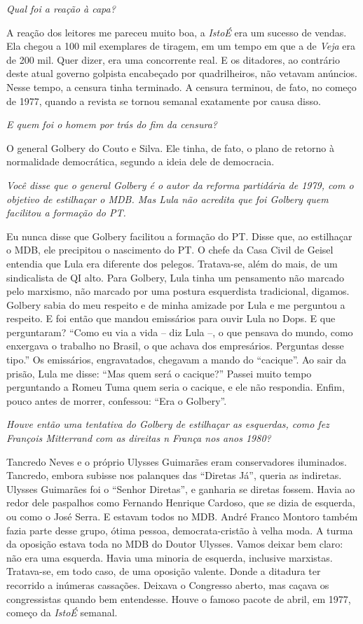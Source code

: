 \itshape
 Qual foi a reação à capa?

\normalfont 
A reação dos leitores me pareceu muito boa, a
\emph{IstoÉ} era um sucesso de vendas. Ela chegou a 100 mil exemplares
de tiragem, em um tempo em que a de \emph{Veja} era de 200 mil. Quer
dizer, era uma concorrente real. E os ditadores, ao contrário deste
atual governo golpista encabeçado por quadrilheiros, não vetavam
anúncios. Nesse tempo, a censura tinha terminado. A censura terminou, de
fato, no começo de 1977, quando a revista se tornou semanal exatamente
por causa disso.

\itshape
 E quem foi o homem por trás do fim da censura?

\normalfont 
O general Golbery do Couto e Silva. Ele tinha, de fato, o
plano de retorno à normalidade democrática, segundo a ideia dele de
democracia.

\itshape
 Você disse que o general Golbery é o autor da reforma
partidária de 1979, com o objetivo de estilhaçar o MDB. Mas Lula não
acredita que foi Golbery quem facilitou a formação do PT.

\normalfont 
Eu nunca disse que Golbery facilitou a formação do PT.
Disse que, ao estilhaçar o MDB, ele precipitou o nascimento do PT. O
chefe da Casa Civil de Geisel entendia que Lula era diferente dos
pelegos. Tratava-se, além do mais, de um sindicalista de QI alto. Para
Golbery, Lula tinha um pensamento não marcado pelo marxismo, não marcado
por uma postura esquerdista tradicional, digamos. Golbery sabia do meu
respeito e de minha amizade por Lula e me perguntou a respeito. E foi
então que mandou emissários para ouvir Lula no Dops. E que perguntaram?
``Como eu via a vida -- diz Lula --, o que pensava do mundo, como
enxergava o trabalho no Brasil, o que achava dos empresários. Perguntas
desse tipo.'' Os emissários, engravatados, chegavam a mando do
``cacique''. Ao sair da prisão, Lula me disse: ``Mas quem será o
cacique?'' Passei muito tempo perguntando a Romeu Tuma quem seria o
cacique, e ele não respondia. Enfim, pouco antes de morrer, confessou:
``Era o Golbery''.

\itshape
 Houve então uma tentativa do Golbery de estilhaçar as
esquerdas, como fez François Mitterrand com as direitas n França nos
anos 1980?

\normalfont 
Tancredo Neves e o próprio Ulysses Guimarães eram
conservadores iluminados. Tancredo, embora subisse nos palanques das
``Diretas Já'', queria as indiretas. Ulysses Guimarães foi o ``Senhor
Diretas'', e ganharia se diretas fossem. Havia ao redor dele paspalhos
como Fernando Henrique Cardoso, que se dizia de esquerda, ou como o José
Serra. E estavam todos no MDB. André Franco Montoro também fazia parte
desse grupo, ótima pessoa, democrata-cristão à velha moda. A turma da
oposição estava toda no MDB do Doutor Ulysses. Vamos deixar bem claro:
não era uma esquerda. Havia uma minoria de esquerda, inclusive
marxistas. Tratava-se, em todo caso, de uma oposição valente. Donde a
ditadura ter recorrido a inúmeras cassações. Deixava o Congresso aberto,
mas caçava os congressistas quando bem entendesse. Houve o famoso pacote
de abril, em 1977, começo da \emph{IstoÉ} semanal.

